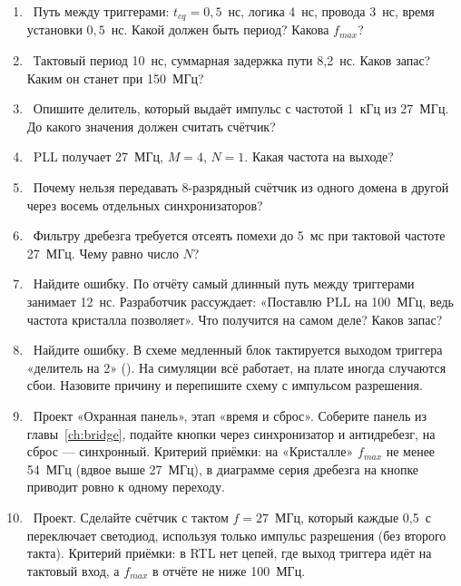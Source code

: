 \begin{taskbox}
\begin{enumerate}
  \item {}~Путь между триггерами: $t_{cq}=0{,}5$~нс, логика $4$~нс, провода $3$~нс,
        время установки $0{,}5$~нс. Какой должен быть период? Какова $f_{max}$?
  \item {}~Тактовый период 10~нс, суммарная задержка пути 8,2~нс. Каков запас?
        Каким он станет при 150~МГц?
  \item {}~Опишите делитель, который выдаёт импульс  с частотой 1~кГц
        из 27~МГц. До какого значения должен считать счётчик?
  \item {}~PLL получает 27~МГц, $M=4$, $N=1$. Какая частота на выходе?
  \item {}~Почему нельзя передавать 8-разрядный счётчик из одного домена в другой
        через восемь отдельных синхронизаторов?
  \item {}~Фильтру дребезга требуется отсеять помехи до 5~мс при тактовой частоте
        27~МГц. Чему равно число $N$?
  \item {}~Найдите ошибку. По отчёту самый длинный путь между триггерами занимает 12~нс.
        Разработчик рассуждает: «Поставлю PLL на 100~МГц, ведь частота кристалла позволяет».
        Что получится на самом деле? Каков запас?
  \item {}~Найдите ошибку. В схеме медленный блок тактируется выходом триггера
        «делитель на 2» (). На симуляции всё работает, на плате
        иногда случаются сбои. Назовите причину и перепишите схему с импульсом разрешения.
  \item {}~Проект «Охранная панель», этап «время и сброс». Соберите панель из главы~\ref{ch:bridge},
        подайте кнопки через синхронизатор и антидребезг, на сброс --- синхронный. Критерий
        приёмки: на «Кристалле» $f_{max}$ не менее 54~МГц (вдвое выше 27~МГц), в диаграмме
        серия дребезга на кнопке приводит ровно к одному переходу.
  \item {}~Проект. Сделайте счётчик с тактом $f=27$~МГц, который каждые 0,5~с
        переключает светодиод, используя только импульс разрешения (без второго такта). Критерий
        приёмки: в RTL нет цепей, где выход триггера идёт на тактовый вход, а $f_{max}$ в отчёте
        не ниже 100~МГц.
\end{enumerate}
\end{taskbox}
